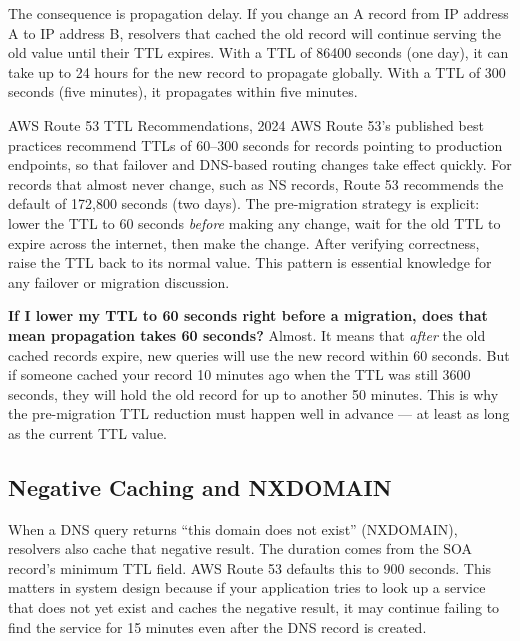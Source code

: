 \documentclass[11pt,a4paper]{article}
\begin{document}
The consequence is propagation delay. If you change an A record from IP address A to IP address B, resolvers that cached the old record will continue serving the old value until their TTL expires. With a TTL of 86400 seconds (one day), it can take up to 24 hours for the new record to propagate globally. With a TTL of 300 seconds (five minutes), it propagates within five minutes.

\begin{industrybox}{AWS Route 53 TTL Recommendations, 2024}
AWS Route 53's published best practices recommend TTLs of 60--300 seconds for records pointing to production endpoints, so that failover and DNS-based routing changes take effect quickly. For records that almost never change, such as NS records, Route 53 recommends the default of 172,800 seconds (two days). The pre-migration strategy is explicit: lower the TTL to 60 seconds \textit{before} making any change, wait for the old TTL to expire across the internet, then make the change. After verifying correctness, raise the TTL back to its normal value. This pattern is essential knowledge for any failover or migration discussion.
\end{industrybox}

\begin{thinkbox}
\textbf{If I lower my TTL to 60 seconds right before a migration, does that mean propagation takes 60 seconds?} Almost. It means that \textit{after} the old cached records expire, new queries will use the new record within 60 seconds. But if someone cached your record 10 minutes ago when the TTL was still 3600 seconds, they will hold the old record for up to another 50 minutes. This is why the pre-migration TTL reduction must happen well in advance --- at least as long as the current TTL value.
\end{thinkbox}

\subsection{Negative Caching and NXDOMAIN}

When a DNS query returns ``this domain does not exist'' (NXDOMAIN), resolvers also cache that negative result. The duration comes from the SOA record's minimum TTL field. AWS Route 53 defaults this to 900 seconds. This matters in system design because if your application tries to look up a service that does not yet exist and caches the negative result, it may continue failing to find the service for 15 minutes even after the DNS record is created.
\end{document}
